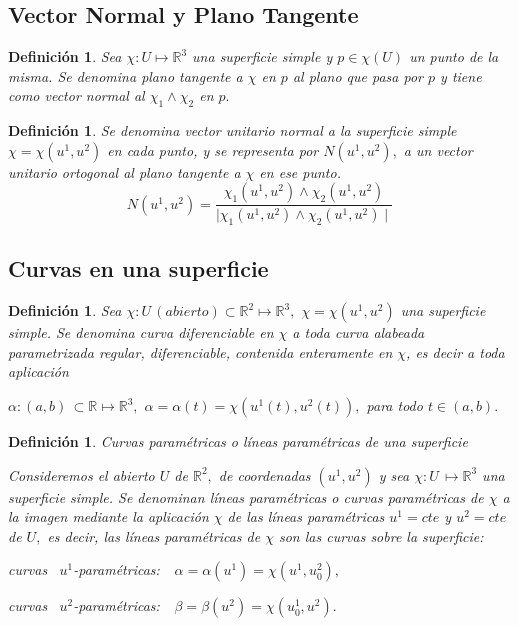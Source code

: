 \documentclass[twoside]{article}
\newtheorem{defi}[theorem]{Definición}
\numberwithin{equation}{section}
\begin{document}
\subsection{Vector Normal y Plano Tangente}

\begin{defi}
Sea $\chi: U \mapsto \mathbb{R}^3$ una superficie simple y $ p\in \chi(U)$ un punto de la misma. Se denomina {\em plano tangente} a $\chi$ en $p$ al plano que pasa por $p$ y tiene como vector normal al $\chi_1 \wedge \chi_2$ en $p.$
\end{defi}

\begin{defi}
Se denomina {\em vector unitario normal} a la superficie simple $\chi = \chi(u^1, u^2)$ en cada punto, y se representa por $ N(u^1, u^2),$ a un vector unitario ortogonal al plano tangente a $\chi$ en ese punto.
\begin{equation*}
N(u^1, u^2) = \frac{\chi_1(u^1, u^2) \wedge \chi_2(u^1, u^2)}{\mid \chi_1(u^1, u^2) \wedge \chi_2(u^1, u^2) \mid}
\end{equation*}
\end{defi}

\subsection{Curvas en una superficie}


\begin{defi} Sea $\chi : U \, (abierto) \subset \mathbb{R}^2 \mapsto \mathbb{R}^3,$ $\chi = \chi(u^1, u^2)$ una superficie simple. Se denomina {\em curva diferenciable} en $\chi$ a toda curva alabeada parametrizada regular, diferenciable, contenida entera\-mente en $\chi$, es decir a toda aplicación

$\alpha : (a,b) \, \subset \mathbb{R} \mapsto \mathbb{R}^3,$ $\alpha =
\alpha(t) = \chi(u^1(t), u^2(t)),$ para todo $ t \in (a,b).$
\end{defi}


\begin{defi} {\em Curvas paramétricas o líneas paramétricas de una superficie}

Consideremos el abierto $U$ de $\mathbb{R}^2,$ de coordenadas
$(u^1, u^2)$ y sea $\chi : U \, \mapsto \mathbb{R}^3$ una
superficie simple. Se denominan {\em líneas paramétricas o curvas
paramétricas} de $\chi$ a la imagen mediante la aplicación  $\chi$
de las líneas paramétricas $u^1 = cte$ y $u^2 = cte$ de $U,$ es decir,
las líneas paramétricas de $\chi$ son las curvas sobre la
superficie:
\begin{center} curvas \, $u^1$-param\'etricas: \,\, $\alpha =
\alpha(u^1) = \chi(u^1, u^2_0),$

curvas \, $u^2$-param\'etricas: \,\, $\beta = \beta(u^2) =
\chi(u^1_0, u^2).$
\end{center}
\end{defi}
\end{document}
